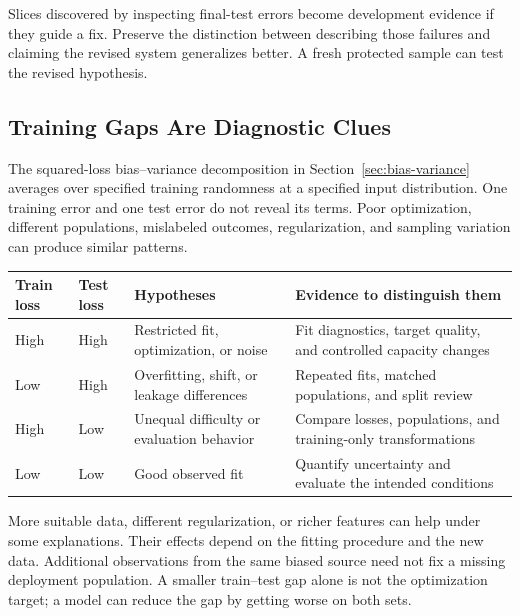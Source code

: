 Slices discovered by inspecting final-test errors become development evidence if they guide a fix. Preserve the distinction between describing those failures and claiming the revised system generalizes better. A fresh protected sample can test the revised hypothesis.

\subsection{Training Gaps Are Diagnostic Clues}

The squared-loss bias--variance decomposition in Section~\ref{sec:bias-variance} averages over specified training randomness at a specified input distribution. One training error and one test error do not reveal its terms. Poor optimization, different populations, mislabeled outcomes, regularization, and sampling variation can produce similar patterns.

\par\addvspace{\intextsep}\noindent\begin{minipage}{\linewidth}
\centering\small
\begin{tabular}{@{}L{1.5cm}L{1.5cm}L{3.0cm}L{3.7cm}@{}}
\toprule
Train loss & Test loss & Hypotheses & Evidence to distinguish them \\
\midrule
High & High & Restricted fit, optimization, or noise & Fit diagnostics, target quality, and controlled capacity changes \\
Low & High & Overfitting, shift, or leakage differences & Repeated fits, matched populations, and split review \\
High & Low & Unequal difficulty or evaluation behavior & Compare losses, populations, and training-only transformations \\
Low & Low & Good observed fit & Quantify uncertainty and evaluate the intended conditions \\
\bottomrule
\end{tabular}
\label{tab:bias-variance-diagnostic}
\end{minipage}\par\addvspace{\intextsep}

More suitable data, different regularization, or richer features can help under some explanations. Their effects depend on the fitting procedure and the new data. Additional observations from the same biased source need not fix a missing deployment population. A smaller train--test gap alone is not the optimization target; a model can reduce the gap by getting worse on both sets.

